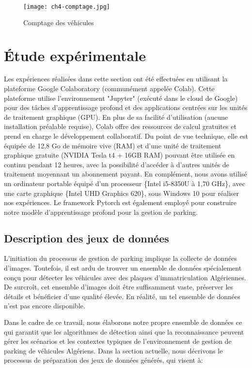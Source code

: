 \begin{figure}[H]
	\centering
	\texttt{[image: ch4-comptage.jpg]}
	\caption{ Comptage des véhicules}
    \label{ch4-comptage}
\end{figure}

\section{Étude expérimentale}

Les expériences réalisées dans cette section ont été effectuées en utilisant
la plateforme Google Colaboratory (communément appelée Colab). Cette plateforme utilise l'environnement "Jupyter" (exécuté dans le cloud de Google) pour des tâches d'apprentissage profond et des applications centrées sur les unités de traitement graphique (GPU). En plus de sa facilité d'utilisation (aucune installation préalable requise), Colab offre des ressources de calcul gratuites et prend en charge le développement collaboratif. Du point de vue technique, elle est équipée de 12,8 Go de mémoire vive (RAM) et d'une unité de traitement graphique gratuite (NVIDIA Tesla t4 + 16GB RAM) pouvant être utilisée en continu pendant 12 heures, avec la possibilité d'accéder à d'autres unités de traitement moyennant un abonnement payant. En complément, nous avons utilisé un ordinateur portable équipé d'un processeur \{Intel i5-8350U à 1,70 GHz\}, avec une carte graphique \{Intel UHD Graphics 620\}, sous Windows 10  pour réaliser nos expériences.
Le framework Pytorch est également employé pour construire notre modèle d'apprentissage profond pour la gestion de parking. 

\subsection{Description des jeux de données}

L'initiation du processus de gestion de parking implique la collecte de données d'images. Toutefois, il est ardu de trouver un ensemble de données spécialement conçu pour détecter les véhicules avec des plaques d'immatriculation Algériennes. De surcroît, cet ensemble d'images doit être suffisamment vaste, préserver les détails et bénéficier d'une qualité élevée. En réalité, un tel ensemble de données n'est pas encore disponible.

Dans le cadre de ce travail, nous élaborons notre propre ensemble de données ce qui garantit que les algorithmes de détection ainsi que la reconnaissance peuvent gérer les scénarios et les contextes typiques de l'environnement de gestion de parking de véhicules Algériens.
Dans la section actuelle, nous décrivons le processus de préparation des jeux de données générés, qui visent à: 

